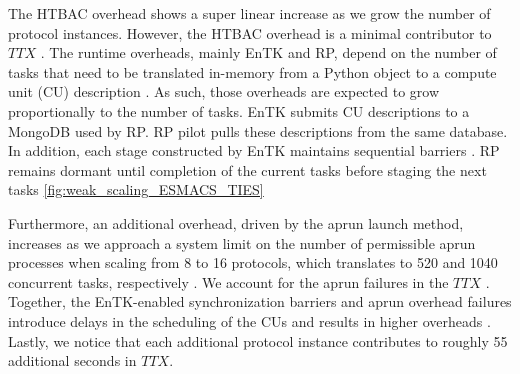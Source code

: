 The HTBAC overhead shows a super linear increase as we grow the number of
protocol instances. However, the HTBAC overhead is a minimal contributor to
\(TTX\) . The runtime overheads, mainly EnTK and RP, depend on the
number of tasks that need to be translated in-memory from a Python object to
a compute unit (CU) description . As such, those
overheads are expected to grow proportionally to the number of tasks. EnTK
submits CU descriptions to a MongoDB used by RP. RP pilot pulls these
descriptions from the same database.
In addition, each stage constructed by EnTK maintains sequential barriers
. RP remains dormant until
completion of the current tasks before staging the next tasks
\ref{fig:weak_scaling_ESMACS_TIES} 


Furthermore, an additional overhead, driven by the aprun  launch method, increases as we
approach a system limit on the number of permissible 
aprun processes when scaling from 8 to 16 protocols, which translates to 520
and 1040 concurrent tasks, respectively . We account for the aprun failures in the \(TTX\)
. Together, the EnTK-enabled
synchronization barriers and aprun overhead failures  introduce delays in the scheduling of the CUs
and results in higher overheads . Lastly, we notice that
each additional protocol instance contributes to roughly 55 additional
seconds in \(TTX\).

